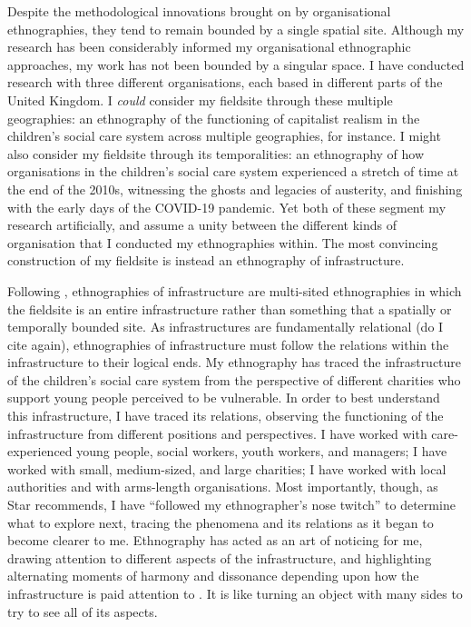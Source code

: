 Despite the methodological innovations brought on by organisational ethnographies, they tend to remain bounded by a single spatial site. Although my research has been considerably informed my organisational ethnographic approaches, my work has not been bounded by a singular space. I have conducted research with three different organisations, each based in different parts of the United Kingdom. I \textit{could} consider my fieldsite through these multiple geographies: an ethnography of the functioning of capitalist realism in the children's social care system across multiple geographies, for instance. I might also consider my fieldsite through its temporalities: an ethnography of how organisations in the children's social care system experienced a stretch of time at the end of the 2010s, witnessing the ghosts and legacies of austerity, and finishing with the early days of the COVID-19 pandemic. Yet both of these segment my research artificially, and assume a unity between the different kinds of organisation that I conducted my ethnographies within. The most convincing construction of my fieldsite is instead an ethnography of infrastructure. 

Following \cite{star_ethnography_1999}, ethnographies of infrastructure are multi-sited ethnographies in which the fieldsite is an entire infrastructure rather than something that a spatially or temporally bounded site. As infrastructures are fundamentally relational (do I cite again), ethnographies of infrastructure must follow the relations within the infrastructure to their logical ends. My ethnography has traced the infrastructure of the children’s social care system from the perspective of different charities who support young people perceived to be vulnerable. In order to best understand this infrastructure, I have traced its relations, observing the functioning of the infrastructure from different positions and perspectives. I have worked with care-experienced young people, social workers, youth workers, and managers; I have worked with small, medium-sized, and large charities; I have worked with local authorities and with arms-length organisations. Most importantly, though, as Star recommends, I have “followed my ethnographer’s nose twitch” to determine what to explore next, tracing the phenomena and its relations as it began to become clearer to me. Ethnography has acted as an art of noticing for me, drawing attention to different aspects of the infrastructure, and highlighting alternating moments of harmony and dissonance depending upon how the infrastructure is paid attention to \citep[24]{tsing_mushroom_2017}. It is like turning an object with many sides to try to see all of its aspects.  

